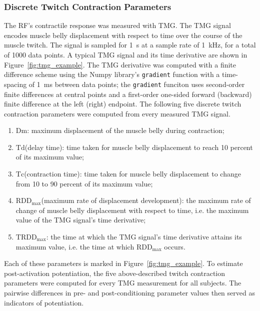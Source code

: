 \documentclass[utf8]{FrontiersinHarvard}
\newcommand{\Dm}{\ensuremath{\text{Dm}}\xspace}
\newcommand{\Td}{\ensuremath{\text{Td}}\xspace}
\newcommand{\Tc}{\ensuremath{\text{Tc}}\xspace}
\newcommand{\RDDMax}{\ensuremath{ \text{RDD}_{\text{max}}}\xspace}
\newcommand{\RDDMaxTime}{\ensuremath{ \text{TRDD}_{\text{max}}}\xspace}
\begin{document}
\subsubsection{Discrete Twitch Contraction Parameters} \label{sss:discrete_twitch_params}
The RF's contractile response was measured with TMG.
The TMG signal encodes muscle belly displacement with respect to time over the course of the muscle twitch.
The signal is sampled for \SI{1}{\second} at a sample rate of \SI{1}{\kilo \hertz}, for a total of 1000 data points.
A typical TMG signal and its time derivative are shown in Figure~\ref{fig:tmg_example}.
The TMG derivative was computed with a finite difference scheme using the Numpy library's \texttt{gradient} function with a time-spacing of \SI{1}{\milli \second} between data points;
the \texttt{gradient} funciton uses second-order finite differences at central points and a first-order one-sided forward (backward) finite difference at the left (right) endpoint.
The following five discrete twitch contraction parameters were computed from every measured TMG signal.
\begin{enumerate}

    \item \Dm: maximum displacement of the muscle belly during contraction;

    \item \Td (delay time): time taken for muscle belly displacement to reach 10 percent of its maximum value;

    \item \Tc (contraction time): time taken for muscle belly displacement to change from 10 to 90 percent of its maximum value;

    \item \RDDMax (maximum rate of displacement development): the maximum rate of change of muscle belly displacement with respect to time, i.e. the maximum value of the TMG signal's time derivative;

    \item \RDDMaxTime: the time at which the TMG signal's time derivative attains its maximum value, i.e. the time at which \RDDMax occurs.

\end{enumerate}
Each of these parameters is marked in Figure~\ref{fig:tmg_example}.
To estimate post-activation potentiation, the five above-described twitch contraction parameters were computed for every TMG measurement for all subjects.
The pairwise differences in pre- and post-conditioning parameter values then served as indicators of potentiation.
\end{document}

